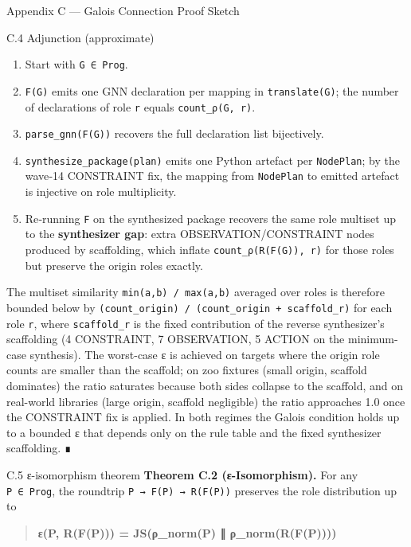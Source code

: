 \documentclass[
  ignorenonframetext,
]{beamer}
\providecommand{\tightlist}{%
  \setlength{\itemsep}{0pt}\setlength{\parskip}{0pt}}
\begin{document}
\begin{frame}[fragile]{Appendix C --- Galois Connection Proof Sketch}
\begin{block}{C.4 Adjunction (approximate)}
\begin{enumerate}
\tightlist
\item
  Start with \texttt{G\ ∈\ Prog}.
\item
  \texttt{F(G)} emits one GNN declaration per mapping in
  \texttt{translate(G)}; the number of declarations of role \texttt{r}
  equals \texttt{count\_ρ(G,\ r)}.
\item
  \texttt{parse\_gnn(F(G))} recovers the full declaration list
  bijectively.
\item
  \texttt{synthesize\_package(plan)} emits one Python artefact per
  \texttt{NodePlan}; by the wave‑14 CONSTRAINT fix, the mapping from
  \texttt{NodePlan} to emitted artefact is injective on role
  multiplicity.
\item
  Re‑running \texttt{F} on the synthesized package recovers the same
  role multiset up to the \textbf{synthesizer gap}: extra
  OBSERVATION/CONSTRAINT nodes produced by scaffolding, which inflate
  \texttt{count\_ρ(R(F(G)),\ r)} for those roles but preserve the origin
  roles exactly.
\end{enumerate}

The multiset similarity \texttt{min(a,b)\ /\ max(a,b)} averaged over
roles is therefore bounded below by
\texttt{(count\_origin)\ /\ (count\_origin\ +\ scaffold\_r)} for each
role \texttt{r}, where \texttt{scaffold\_r} is the fixed contribution of
the reverse synthesizer's scaffolding (4 CONSTRAINT, 7 OBSERVATION, 5
ACTION on the minimum-case synthesis). The worst-case ε is achieved on
targets where the origin role counts are smaller than the scaffold; on
zoo fixtures (small origin, scaffold dominates) the ratio saturates
because both sides collapse to the scaffold, and on real-world libraries
(large origin, scaffold negligible) the ratio approaches 1.0 once the
CONSTRAINT fix is applied. In both regimes the Galois condition holds up
to a bounded ε that depends only on the rule table and the fixed
synthesizer scaffolding. ∎
\end{block}

\begin{block}{C.5 ε-isomorphism theorem}
\protect{}\label{c.5-ux3b5-isomorphism-theorem}
\textbf{Theorem C.2 (ε-Isomorphism).} For any \texttt{P\ ∈\ Prog}, the
roundtrip \texttt{P\ →\ F(P)\ →\ R(F(P))} preserves the role
distribution up to

\begin{quote}
\textbf{ε(P, R(F(P))) = JS(ρ\_norm(P) ∥ ρ\_norm(R(F(P))))}
\end{quote}


\end{block}
\end{frame}
\end{document}
